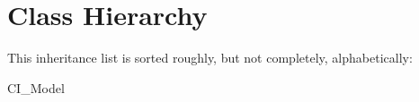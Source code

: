 \section{Class Hierarchy}
This inheritance list is sorted roughly, but not completely, alphabetically\+:\begin{DoxyCompactList}
\item C\+I\+\_\+\+Model\begin{DoxyCompactList}
\item {}
\item {}
\item {}
\end{DoxyCompactList}
\end{DoxyCompactList}
